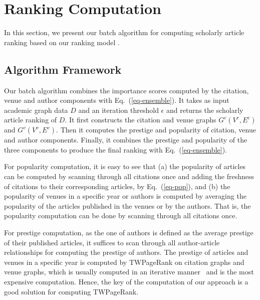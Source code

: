 \section{Ranking Computation}
\label{sec-alg}

In this section, we present our batch algorithm for computing scholarly article ranking based on our ranking model \ensemblerank.

\subsection{Algorithm Framework}
\label{subsec-bat-alg}

Our batch algorithm \batensemble  combines the importance scores computed by the citation, venue and author components with Eq.~(\ref{eq-ensemble}). It takes as input academic graph data $D$ and an iteration threshold $\epsilon$ and returns the scholarly article ranking of $D$. It first constructs the citation and venue graphs $G^c(V^c,E^c)$ and $G^v(V^v,E^v)$. Then it computes the prestige and popularity of citation, venue and author components.
Finally, it combines the  prestige and popularity of the three components to produce the final ranking with Eq.~(\ref{eq-ensemble}).



For popularity computation, it is easy to see that
(a) the popularity of articles can be computed by scanning through all citations once and adding the freshness of citations to their corresponding articles, by Eq.~(\ref{eq-pop}), and (b) the popularity of venues in a specific year or authors is computed by averaging the popularity of the articles published in the venues or by the authors.
That is, the popularity computation can be done by scanning through all citations once.


For prestige computation, as the one of authors is defined as the average prestige of their published articles,
it suffices to scan through all author-article  relationships for computing the prestige of authors. The prestige of  articles and venues in a specific year is computed by TWPageRank on citation graphs and venue graphs, which is usually computed in an iterative manner~\cite{Brin98:PageRank} and is the most expensive computation. Hence, the key of the computation of our approach is a good solution for computing TWPageRank.


